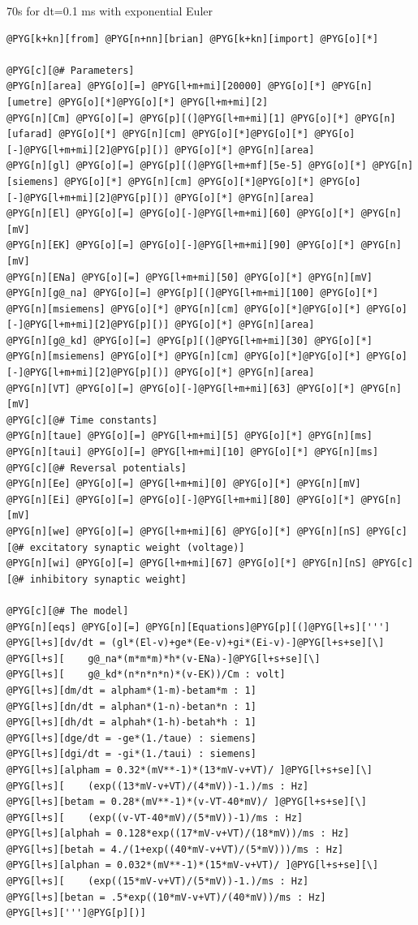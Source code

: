 \documentclass[letterpaper,10pt,english]{manual}
\begin{document}
70s for dt=0.1 ms with exponential Euler

\begin{Verbatim}[commandchars=@\[\]]
@PYG[k+kn][from] @PYG[n+nn][brian] @PYG[k+kn][import] @PYG[o][*]

@PYG[c][@# Parameters]
@PYG[n][area] @PYG[o][=] @PYG[l+m+mi][20000] @PYG[o][*] @PYG[n][umetre] @PYG[o][*]@PYG[o][*] @PYG[l+m+mi][2]
@PYG[n][Cm] @PYG[o][=] @PYG[p][(]@PYG[l+m+mi][1] @PYG[o][*] @PYG[n][ufarad] @PYG[o][*] @PYG[n][cm] @PYG[o][*]@PYG[o][*] @PYG[o][-]@PYG[l+m+mi][2]@PYG[p][)] @PYG[o][*] @PYG[n][area]
@PYG[n][gl] @PYG[o][=] @PYG[p][(]@PYG[l+m+mf][5e-5] @PYG[o][*] @PYG[n][siemens] @PYG[o][*] @PYG[n][cm] @PYG[o][*]@PYG[o][*] @PYG[o][-]@PYG[l+m+mi][2]@PYG[p][)] @PYG[o][*] @PYG[n][area]
@PYG[n][El] @PYG[o][=] @PYG[o][-]@PYG[l+m+mi][60] @PYG[o][*] @PYG[n][mV]
@PYG[n][EK] @PYG[o][=] @PYG[o][-]@PYG[l+m+mi][90] @PYG[o][*] @PYG[n][mV]
@PYG[n][ENa] @PYG[o][=] @PYG[l+m+mi][50] @PYG[o][*] @PYG[n][mV]
@PYG[n][g@_na] @PYG[o][=] @PYG[p][(]@PYG[l+m+mi][100] @PYG[o][*] @PYG[n][msiemens] @PYG[o][*] @PYG[n][cm] @PYG[o][*]@PYG[o][*] @PYG[o][-]@PYG[l+m+mi][2]@PYG[p][)] @PYG[o][*] @PYG[n][area]
@PYG[n][g@_kd] @PYG[o][=] @PYG[p][(]@PYG[l+m+mi][30] @PYG[o][*] @PYG[n][msiemens] @PYG[o][*] @PYG[n][cm] @PYG[o][*]@PYG[o][*] @PYG[o][-]@PYG[l+m+mi][2]@PYG[p][)] @PYG[o][*] @PYG[n][area]
@PYG[n][VT] @PYG[o][=] @PYG[o][-]@PYG[l+m+mi][63] @PYG[o][*] @PYG[n][mV]
@PYG[c][@# Time constants]
@PYG[n][taue] @PYG[o][=] @PYG[l+m+mi][5] @PYG[o][*] @PYG[n][ms]
@PYG[n][taui] @PYG[o][=] @PYG[l+m+mi][10] @PYG[o][*] @PYG[n][ms]
@PYG[c][@# Reversal potentials]
@PYG[n][Ee] @PYG[o][=] @PYG[l+m+mi][0] @PYG[o][*] @PYG[n][mV]
@PYG[n][Ei] @PYG[o][=] @PYG[o][-]@PYG[l+m+mi][80] @PYG[o][*] @PYG[n][mV]
@PYG[n][we] @PYG[o][=] @PYG[l+m+mi][6] @PYG[o][*] @PYG[n][nS] @PYG[c][@# excitatory synaptic weight (voltage)]
@PYG[n][wi] @PYG[o][=] @PYG[l+m+mi][67] @PYG[o][*] @PYG[n][nS] @PYG[c][@# inhibitory synaptic weight]

@PYG[c][@# The model]
@PYG[n][eqs] @PYG[o][=] @PYG[n][Equations]@PYG[p][(]@PYG[l+s][''']
@PYG[l+s][dv/dt = (gl*(El-v)+ge*(Ee-v)+gi*(Ei-v)-]@PYG[l+s+se][\]
@PYG[l+s][    g@_na*(m*m*m)*h*(v-ENa)-]@PYG[l+s+se][\]
@PYG[l+s][    g@_kd*(n*n*n*n)*(v-EK))/Cm : volt]
@PYG[l+s][dm/dt = alpham*(1-m)-betam*m : 1]
@PYG[l+s][dn/dt = alphan*(1-n)-betan*n : 1]
@PYG[l+s][dh/dt = alphah*(1-h)-betah*h : 1]
@PYG[l+s][dge/dt = -ge*(1./taue) : siemens]
@PYG[l+s][dgi/dt = -gi*(1./taui) : siemens]
@PYG[l+s][alpham = 0.32*(mV**-1)*(13*mV-v+VT)/ ]@PYG[l+s+se][\]
@PYG[l+s][    (exp((13*mV-v+VT)/(4*mV))-1.)/ms : Hz]
@PYG[l+s][betam = 0.28*(mV**-1)*(v-VT-40*mV)/ ]@PYG[l+s+se][\]
@PYG[l+s][    (exp((v-VT-40*mV)/(5*mV))-1)/ms : Hz]
@PYG[l+s][alphah = 0.128*exp((17*mV-v+VT)/(18*mV))/ms : Hz]
@PYG[l+s][betah = 4./(1+exp((40*mV-v+VT)/(5*mV)))/ms : Hz]
@PYG[l+s][alphan = 0.032*(mV**-1)*(15*mV-v+VT)/ ]@PYG[l+s+se][\]
@PYG[l+s][    (exp((15*mV-v+VT)/(5*mV))-1.)/ms : Hz]
@PYG[l+s][betan = .5*exp((10*mV-v+VT)/(40*mV))/ms : Hz]
@PYG[l+s][''']@PYG[p][)]


\end{Verbatim}
\end{document}
